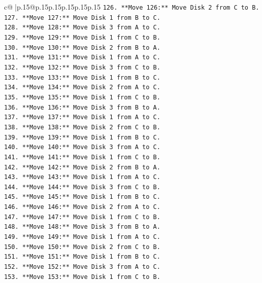 \documentclass{article}
\begin{document}
{\begin{supertabular}{c@{$\;$}|p{.15\linewidth}@{}p{.15\linewidth}p{.15\linewidth}p{.15\linewidth}p{.15\linewidth}p{.15\linewidth}}
{{{\texttt{126. **Move 126:** Move Disk 2 from C to B.} \\
\texttt{127. **Move 127:** Move Disk 1 from B to C.} \\
\texttt{128. **Move 128:** Move Disk 3 from A to C.} \\
\texttt{129. **Move 129:** Move Disk 1 from C to B.} \\
\texttt{130. **Move 130:** Move Disk 2 from B to A.} \\
\texttt{131. **Move 131:** Move Disk 1 from A to C.} \\
\texttt{132. **Move 132:** Move Disk 3 from C to B.} \\
\texttt{133. **Move 133:** Move Disk 1 from B to C.} \\
\texttt{134. **Move 134:** Move Disk 2 from A to C.} \\
\texttt{135. **Move 135:** Move Disk 1 from C to B.} \\
\texttt{136. **Move 136:** Move Disk 3 from B to A.} \\
\texttt{137. **Move 137:** Move Disk 1 from A to C.} \\
\texttt{138. **Move 138:** Move Disk 2 from C to B.} \\
\texttt{139. **Move 139:** Move Disk 1 from B to C.} \\
\texttt{140. **Move 140:** Move Disk 3 from A to C.} \\
\texttt{141. **Move 141:** Move Disk 1 from C to B.} \\
\texttt{142. **Move 142:** Move Disk 2 from B to A.} \\
\texttt{143. **Move 143:** Move Disk 1 from A to C.} \\
\texttt{144. **Move 144:** Move Disk 3 from C to B.} \\
\texttt{145. **Move 145:** Move Disk 1 from B to C.} \\
\texttt{146. **Move 146:** Move Disk 2 from A to C.} \\
\texttt{147. **Move 147:** Move Disk 1 from C to B.} \\
\texttt{148. **Move 148:** Move Disk 3 from B to A.} \\
\texttt{149. **Move 149:** Move Disk 1 from A to C.} \\
\texttt{150. **Move 150:** Move Disk 2 from C to B.} \\
\texttt{151. **Move 151:** Move Disk 1 from B to C.} \\
\texttt{152. **Move 152:** Move Disk 3 from A to C.} \\
\texttt{153. **Move 153:** Move Disk 1 from C to B.} \\
}}}
\end{supertabular}}
\end{document}
